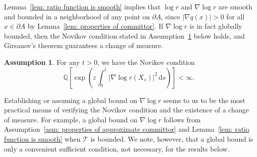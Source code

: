 \documentclass[reqno]{amsart}
\newcommand{\eps}{\varepsilon}
\newcommand{\1}{\mathds{1}}
\renewcommand{\d}{\mathrm{d}}
\newcommand{\grad}{\nabla}
\newcommand{\Q}{\mathds{Q}}
\theoremstyle{definition}
\newtheorem{assumption}{Assumption}
\theoremstyle{remark}
\newcommand{\D}{\mathscr{T}}
\begin{document}
Lemma~\ref{lem: ratio function is smooth} implies that $\log r$ and $\grad \log r$ are smooth and bounded in a neighborhood of any point on $\partial A$, since $\lvert \grad q (x) \rvert >0$ for all $x \in \partial A$ by Lemma~\ref{lem: properties of committor}. If $\grad \log r$ is in fact globally bounded, then the Novikov condition stated in Assumption~\ref{asm: novikov} below holds, and Girsanov's theorem guarantees a change of measure. 

\begin{assumption}\label{asm: novikov}
   For any $t >0$, we have the Novikov condition
  \begin{equation*}
    \Q \left [ \exp \left (\eps \int_0^t \lvert \grad \log r(X_s) \rvert^2 \, \d s \right ) \right ] < \infty.
  \end{equation*}
\end{assumption}

Establishing or assuming a global bound on $\grad \log r$ seems to us to be the most practical means of verifying the Novikov condition and the existence of a change of measure. For example, a global bound on $\grad \log r$ follows from Assumption~\ref{asm: properties of approximate committor} and Lemma~\ref{lem: ratio function is smooth} when $\D$ is bounded.  We note, however, that a global bound is only a convenient sufficient condition, not necessary, for the results below. 

\end{document}
